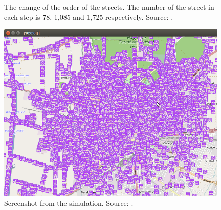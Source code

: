 \documentclass[b5paper,12pt]{report}
\theoremstyle{definition}
\begin{document}
\begin{figure}[!t]
    \centering
    \hspace{0em}
    \hspace{0em}
    \hspace{0em}
    \caption{The change of the order of the streets. The number of the street in each step is 78, 1,085 and 1,725 respectively. Source: \cite{infocomjournal}.}
    \label{histoder}
\end{figure}

\begin{figure}[ht]
\centerline{
\includegraphics[width=11cm]{img/a33.png}}
\caption{Screenshot from the simulation. Source: \cite{infocomjournal}.}
\label{simultenth}
\end{figure}
\end{document}
